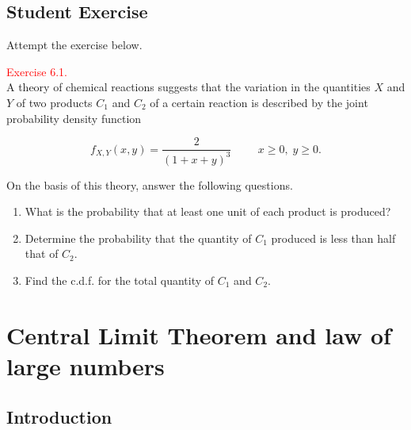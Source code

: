 \documentclass[
]{book}
\providecommand{\tightlist}{%
  \setlength{\itemsep}{0pt}\setlength{\parskip}{0pt}}
\begin{document}
\hypertarget{jointdis:exer}{%
\section*{\texorpdfstring{{\textbf{Student Exercise}}}{Student Exercise}}\label{jointdis:exer}}

Attempt the exercise below.

\hypertarget{exer6:1}{}
\textcolor{red}{Exercise 6.1.}\\
A theory of chemical reactions suggests that the variation in the quantities \(X\) and \(Y\) of two products \(C_1\) and \(C_2\) of a certain reaction is described by the joint probability density function

\[ f_{X,Y} (x,y) = \frac{2}{(1+x+y)^3} \hspace{1cm} x \geq 0, \; y \geq 0. \]

On the basis of this theory, answer the following questions.

\begin{enumerate}
\def\labelenumi{(\alph{enumi})}
\tightlist
\item
  What is the probability that at least one unit of each product is produced?\\
\item
  Determine the probability that the quantity of \(C_1\) produced is less than half that of \(C_2\).\\
\item
  Find the c.d.f. for the total quantity of \(C_1\) and \(C_2\).\\
\end{enumerate}

\hypertarget{Sec_CLT}{%
\chapter{Central Limit Theorem and law of large numbers}\label{Sec_CLT}}

\hypertarget{Sec_CLT:intro}{%
\section{Introduction}\label{Sec_CLT:intro}}
\end{document}
